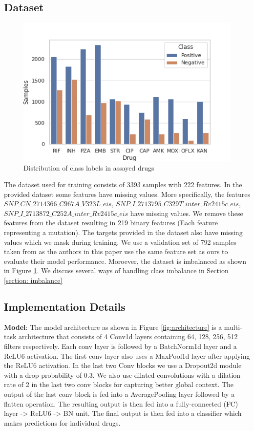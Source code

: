 \documentclass{article}
\begin{document}
\subsection{Dataset}
\begin{figure}
  \centering
  \includegraphics[scale=0.7]{plot.png}
  \caption{Distribution of class labels in assayed drugs}
  \label{fig: class_distribution}
\end{figure}
The dataset used for training consists of 3393 samples with 222 features. In the provided dataset some features
have missing values. More specifically, the features $SNP\_CN\_2714366\_C967A\_V323L\_eis$,
$SNP\_I\_2713795\_C329T\_inter\_Rv2415c\_eis$, $SNP\_I\_2713872\_C252A\_inter\_Rv2415c\_eis$ have missing values.
We remove these features from the dataset resulting in 219 binary features (Each feature representing
a mutation). The targets provided in the dataset also have missing values which we mask during training. We use
a validation set of 792 samples taken from \cite{CHEN2019356} as the authors in this paper use the same feature set as ours
to evaluate their model performance. Moroever, the dataset is imbalanced as
shown in Figure \ref{fig: class_distribution}. We discuss several ways of handling class imbalance in Section \ref{section: imbalance}

\subsection{Implementation Details}
\label{section:hyper}

\textbf{Model}: The model architecture as shown in Figure \ref{fig:architecture} is a multi-task architecture that 
consists of 4 Conv1d layers containing
{64, 128, 256, 512} filters respectively. Each conv layer is followed by a BatchNorm1d layer and a ReLU6
activation. The first conv layer also uses a MaxPool1d layer after applying the ReLU6 activation. In the
last two Conv blocks we use a Dropout2d module with a drop probability of 0.3. We also use
dilated convolutions with a dilation rate of 2 in the last two conv blocks for capturing better global context.
The output of the last conv
block is fed into a AveragePooling layer followed by a flatten operation. The resulting output is then
fed into a fully-connected (FC) layer -> ReLU6 -> BN unit. The final output is then fed into a classifier which
makes predictions for individual drugs.
\end{document}
